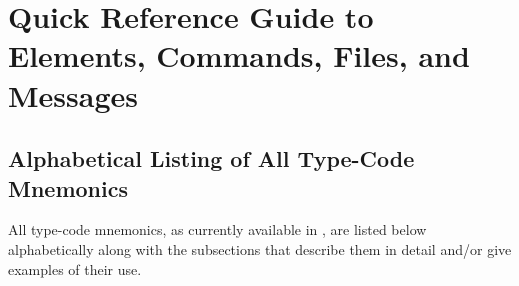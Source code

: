 
\chapter[Quick Reference Guide to Elements, Commands, $\cdots$]{Quick Reference Guide to Elements, Commands, Files, and Messages}  
\section{Alphabetical Listing of All Type-Code Mnemonics}
     All type-code mnemonics, as currently
available in , are listed below alphabetically along with the
subsections that describe them in detail and/or give examples of their
use.

